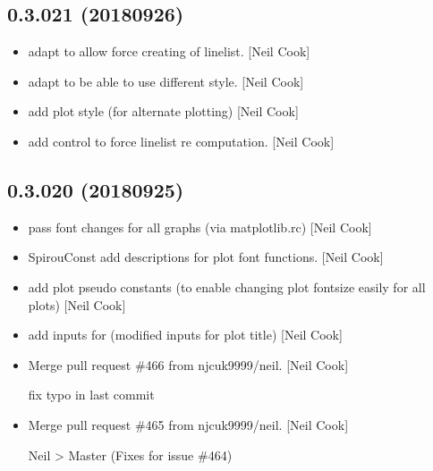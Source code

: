 \documentclass[a4paper,10pt,english]{report}
\begin{document}
\subsection{0.3.021 (2018\sphinxhyphen{}09\sphinxhyphen{}26)}
\label{\detokenize{misc/changelog:id329}}\begin{itemize}
\item {} 
 \sphinxhyphen{} adapt to allow force creating of linelist. {[}Neil Cook{]}

\item {} 
 \sphinxhyphen{} adapt to be able to use different style. {[}Neil Cook{]}

\item {} 
 \sphinxhyphen{} add plot style (for alternate plotting) {[}Neil Cook{]}

\item {} 
 \sphinxhyphen{} add control to force linelist re\sphinxhyphen{}
computation. {[}Neil Cook{]}

\end{itemize}


\subsection{0.3.020 (2018\sphinxhyphen{}09\sphinxhyphen{}25)}
\label{\detokenize{misc/changelog:id330}}\begin{itemize}
\item {} 
 \sphinxhyphen{} pass font changes for all graphs (via matplotlib.rc)
{[}Neil Cook{]}

\item {} 
SpirouConst \sphinxhyphen{} add descriptions for plot font functions. {[}Neil Cook{]}

\item {} 
 \sphinxhyphen{} add plot pseudo constants (to enable changing plot
fontsize easily \sphinxhyphen{} for all plots) {[}Neil Cook{]}

\item {} 
 \sphinxhyphen{} add inputs for  (modified
inputs for plot title) {[}Neil Cook{]}

\item {} 
Merge pull request \#466 from njcuk9999/neil. {[}Neil Cook{]}

fix typo in last commit

\item {} 
Merge pull request \#465 from njcuk9999/neil. {[}Neil Cook{]}

Neil \textendash{}\textgreater{} Master (Fixes for issue \#464)

\end{itemize}
\end{document}
